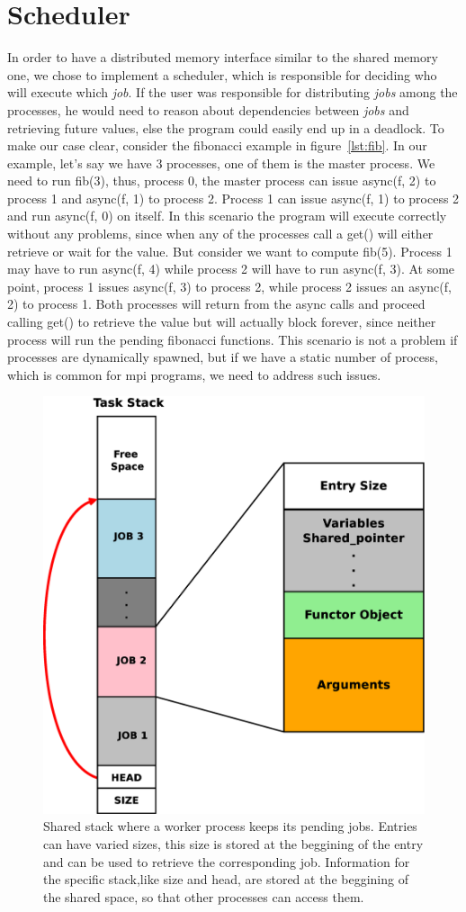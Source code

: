 \section{Scheduler}
\label{sect:scheduler}
In order to have a distributed memory interface similar to the shared memory one, we chose to implement 
a scheduler, which is responsible for deciding who will execute which \emph{job}.  If the user was 
responsible for distributing \emph{jobs} among the processes,  he would need to reason about dependencies
between \emph{jobs} and retrieving future values, else the program could easily end up in a deadlock.
To make our case clear, consider the fibonacci example in figure~\ref{lst:fib}.  
In our example, let's say we have
3 processes, one of them is the master process.  We need to run fib(3), thus, process 0, the master process 
can issue async(f, 2) to process 1 and async(f, 1) to process 2.  Process 1 can issue async(f, 1) to 
process 2 and run async(f, 0) on itself.  In this scenario the program will execute correctly without any
problems, since when any of the processes call a get() will either retrieve or wait for the value.  But 
consider we want to compute fib(5).  Process 1 may have to run async(f, 4) while process 2 will have to run
async(f, 3).  At some point, process 1 issues async(f, 3) to process 2, while process 2 issues an async(f, 2)
to process 1.  Both processes will return from the async calls and proceed calling get() to retrieve the value
but will actually block forever, since neither process will run the pending fibonacci functions.  This scenario
is not a problem if processes are dynamically spawned, but if we have a static number of process, which is
common for mpi programs, we need to address such issues.  

\begin{figure}[here]
\center
\includegraphics[width=0.5\columnwidth]{figures/task_stack}
\caption{Shared stack where a worker process keeps its pending jobs.  Entries can have varied sizes, this
size is stored at the beggining of the entry and can be used to retrieve the corresponding job.  Information
for the specific stack,like size and head, are stored at the beggining of the shared space, so that other
processes can access them.}
\label{fig:task_stack}
\end{figure}


